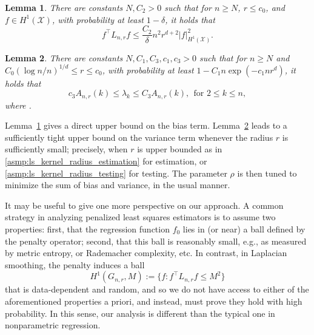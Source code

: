 \documentclass[twoside]{article}
\newcommand{\1}{\mathbf{1}}
\newcommand{\Lap}{L}
\newcommand{\Xset}{\mathcal{X}}
\newtheorem{lemma}{Lemma}
\theoremstyle{definition}
\theoremstyle{remark}
\begin{document}
\begin{lemma}
	\label{lem:graph_sobolev_seminorm}
  There are constants $N,C_2 > 0$ such that for $n \geq N$, $r \leq c_0$, and $f \in H^1(\Xset)$, with probability at least $1 - \delta$, it holds that
	\begin{equation}
	\label{eqn:graph_sobolev_seminorm}
	f^\top \Lap_{n,r} f \leq \frac{C_2}{\delta} n^2 r^{d + 2} |f|_{H^1(\Xset)}^2.
	\end{equation}
\end{lemma}

\begin{lemma}
	\label{lem:neighborhood_eigenvalue} 
  There are constants $N,C_1,C_3,c_1,c_3 > 0$ such that for $n \geq N$ and $C_0(\log n/n)^{1/d} \leq r \leq c_0$, with probability at least $1 - C_1n\exp(-c_1nr^d)$, it holds that
	\begin{equation}
	\label{eqn:neighborhood_eigenvalue}
	c_3A_{n,r}(k) \leq \lambda_k \leq C_3A_{n,r}(k), ~~\textrm{for $2 \leq k \leq n$},
	\end{equation}
where .
\end{lemma}

Lemma~\ref{lem:graph_sobolev_seminorm} gives a direct upper bound on the bias term. Lemma~\ref{lem:neighborhood_eigenvalue} leads to a sufficiently tight upper bound on the variance term whenever the radius $r$ is sufficiently small; precisely, when $r$ is upper bounded as in \ref{asmp:ls_kernel_radius_estimation} for estimation, or \ref{asmp:ls_kernel_radius_testing} for testing. The parameter $\rho$ is then tuned to minimize the sum of bias and variance, in the usual manner.

It may be useful to give one more perspective on our approach. A common strategy in analyzing penalized least squares estimators is to assume two properties: first, that the regression function $f_0$ lies in (or near) a ball defined by the penalty operator; second, that this ball is reasonably small, e.g., as measured by metric entropy, or Rademacher complexity, etc. In contrast, in Laplacian smoothing, the penalty induces a ball
\begin{equation*}
H^1(G_{n,r},M) := \{f: f^\top \Lap_{n,r} f \leq M^2\}
\end{equation*}
that is data-dependent and random, and so we do not have access to either of the aforementioned properties a priori, and instead, must prove they hold with high probability. In this sense, our analysis is different than the typical one in nonparametric regression.
\end{document}
